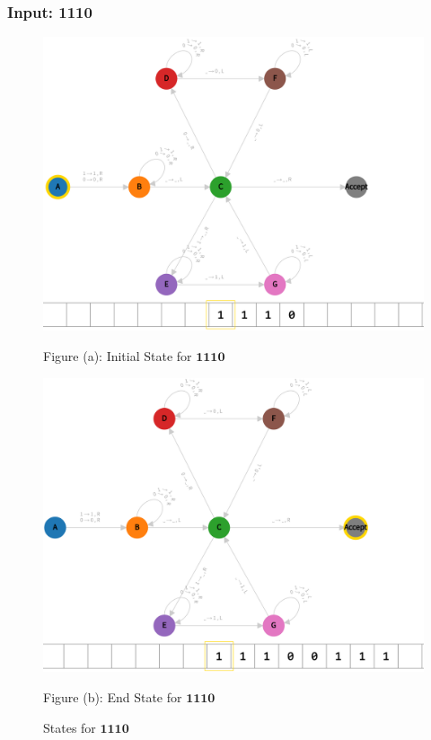 \subsubsection*{Input: 1110}
\label{q2-1110}

\begin{figure}[ht]
  \centering
  \begin{minipage}{.49\linewidth}
    \centering
    \includegraphics[width=\linewidth]{answers/img/q2-1110-initial.png}
    \caption*{Figure (a): Initial State for $\mathbf{1110}$}
    \label{fig:1110-initial}
  \end{minipage}
  \begin{minipage}{.49\linewidth}
    \centering
    \includegraphics[width=\linewidth]{answers/img/q2-1110-end.png}
    \caption*{Figure (b): End State for $\mathbf{1110}$}
    \label{fig:1110-end}
  \end{minipage}
  \caption{States for $\mathbf{1110}$}
  \label{fig:in-1110}
\end{figure}

